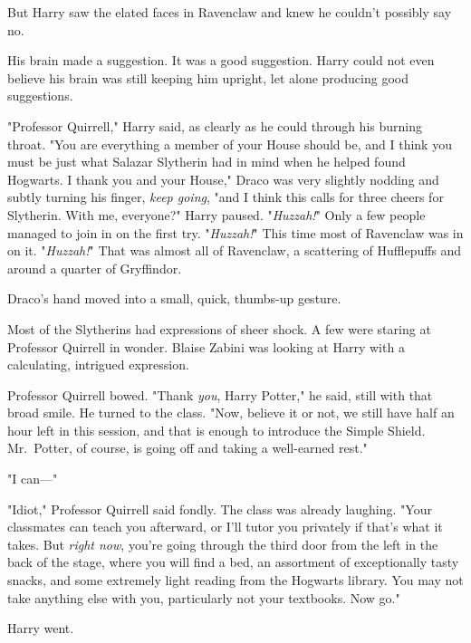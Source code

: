 But Harry saw the elated faces in Ravenclaw and knew he couldn't possibly say 
no.

His brain made a suggestion. It was a good suggestion. Harry could not even 
believe his brain was still keeping him upright, let alone producing good 
suggestions.

"Professor Quirrell," Harry said, as clearly as he could through his burning 
throat. "You are everything a member of your House should be, and I think you 
must be just what Salazar Slytherin had in mind when he helped found Hogwarts. 
I thank you and your House," Draco was very slightly nodding and subtly turning 
his finger, \emph{keep going}, "and I think this calls for three cheers for 
Slytherin. With me, everyone?" Harry paused. "\emph{Huzzah!}" Only a few people 
managed to join in on the first try. "\emph{Huzzah!}" This time most of 
Ravenclaw was in on it. "\emph{Huzzah!}" That was almost all of Ravenclaw, a 
scattering of Hufflepuffs and around a quarter of Gryffindor.

Draco's hand moved into a small, quick, thumbs-up gesture.

Most of the Slytherins had expressions of sheer shock. A few were staring at 
Professor Quirrell in wonder. Blaise Zabini was looking at Harry with a 
calculating, intrigued expression.

Professor Quirrell bowed. "Thank \emph{you}, Harry Potter," he said, still with 
that broad smile. He turned to the class. "Now, believe it or not, we still 
have half an hour left in this session, and that is enough to introduce the 
Simple Shield. Mr.~Potter, of course, is going off and taking a well-earned 
rest."

"I can---"

"Idiot," Professor Quirrell said fondly. The class was already laughing. "Your 
classmates can teach you afterward, or I'll tutor you privately if that's what 
it takes. But \emph{right now}, you're going through the third door from the 
left in the back of the stage, where you will find a bed, an assortment of 
exceptionally tasty snacks, and some extremely light reading from the Hogwarts 
library. You may not take anything else with you, particularly not your 
textbooks. Now go."

Harry went.
